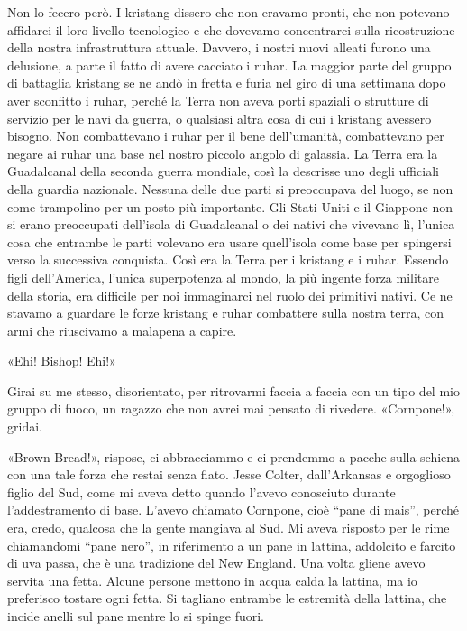 Non lo fecero però. I kristang dissero che non eravamo pronti, che non
potevano affidarci il loro livello tecnologico e che dovevamo
concentrarci sulla ricostruzione della nostra infrastruttura attuale.
Davvero, i nostri nuovi alleati furono una delusione, a parte il fatto
di avere cacciato i ruhar. La maggior parte del gruppo di battaglia
kristang se ne andò in fretta e furia nel giro di una settimana dopo
aver sconfitto i ruhar, perché la Terra non aveva porti spaziali o
strutture di servizio per le navi da guerra, o qualsiasi altra cosa di
cui i kristang avessero bisogno. Non combattevano i ruhar per il bene
dell'umanità, combattevano per negare ai ruhar una base nel nostro
piccolo angolo di galassia. La Terra era la Guadalcanal della seconda
guerra mondiale, così la descrisse uno degli ufficiali della guardia
nazionale. Nessuna delle due parti si preoccupava del luogo, se non come
trampolino per un posto più importante. Gli Stati Uniti e il Giappone
non si erano preoccupati dell'isola di Guadalcanal o dei nativi che
vivevano lì, l'unica cosa che entrambe le parti volevano era usare
quell'isola come base per spingersi verso la successiva conquista. Così
era la Terra per i kristang e i ruhar. Essendo figli dell'America,
l'unica superpotenza al mondo, la più ingente forza militare della
storia, era difficile per noi immaginarci nel ruolo dei primitivi
nativi. Ce ne stavamo a guardare le forze kristang e ruhar combattere
sulla nostra terra, con armi che riuscivamo a malapena a capire.

\hfill\break

«Ehi! Bishop! Ehi!»

Girai su me stesso, disorientato, per ritrovarmi faccia a faccia con un
tipo del mio gruppo di fuoco, un ragazzo che non avrei mai pensato di
rivedere. «Cornpone!», gridai.

«Brown Bread!», rispose, ci abbracciammo e ci prendemmo a pacche sulla
schiena con una tale forza che restai senza fiato. Jesse Colter,
dall'Arkansas e orgoglioso figlio del Sud, come mi aveva detto quando
l'avevo conosciuto durante l'addestramento di base. L'avevo chiamato
Cornpone, cioè ``pane di mais'', perché era, credo, qualcosa che la
gente mangiava al Sud. Mi aveva risposto per le rime chiamandomi ``pane
nero'', in riferimento a un pane in lattina, addolcito e farcito di uva
passa, che è una tradizione del New England. Una volta gliene avevo
servita una fetta. Alcune persone mettono in acqua calda la lattina, ma
io preferisco tostare ogni fetta. Si tagliano entrambe le estremità
della lattina, che incide anelli sul pane mentre lo si spinge fuori.

